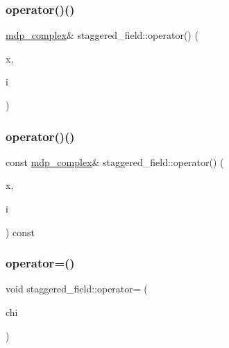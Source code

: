 \mbox{\label{classstaggered__field_a32b4553845d0b7f92f99f07e0fbeb64a}} 
\subsubsection{\texorpdfstring{operator()()}{operator()()}\hspace{0.1cm}{\footnotesize\ttfamily [2/3]}}
{\footnotesize\ttfamily \hyperlink{classmdp__complex}{mdp\+\_\+complex}\& staggered\+\_\+field\+::operator() (\begin{DoxyParamCaption}\item[{\hyperlink{mdp__compatibility__macros_8h_aa6f1179c424e48adef1cedf7c436eb75}{site}}]{x,  }\item[{int}]{i }\end{DoxyParamCaption})\hspace{0.3cm}{\ttfamily [inline]}}

\mbox{\label{classstaggered__field_a212b5ab1660981c1403604216d378f44}} 
\subsubsection{\texorpdfstring{operator()()}{operator()()}\hspace{0.1cm}{\footnotesize\ttfamily [3/3]}}
{\footnotesize\ttfamily const \hyperlink{classmdp__complex}{mdp\+\_\+complex}\& staggered\+\_\+field\+::operator() (\begin{DoxyParamCaption}\item[{\hyperlink{mdp__compatibility__macros_8h_aa6f1179c424e48adef1cedf7c436eb75}{site}}]{x,  }\item[{int}]{i }\end{DoxyParamCaption}) const\hspace{0.3cm}{\ttfamily [inline]}}

\mbox{\label{classstaggered__field_a5320371c9d4b87255c578e5b41684e48}} 
\subsubsection{\texorpdfstring{operator=()}{operator=()}\hspace{0.1cm}{\footnotesize\ttfamily [1/2]}}
{\footnotesize\ttfamily void staggered\+\_\+field\+::operator= (\begin{DoxyParamCaption}\item[{const \hyperlink{classstaggered__field}{staggered\+\_\+field} \&}]{chi }\end{DoxyParamCaption})\hspace{0.3cm}{\ttfamily [inline]}}

